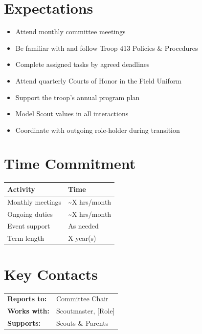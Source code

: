 \documentclass[11pt, letterpaper]{article}
\begin{document}
\hfill
\begin{minipage}[t]{0.48\linewidth}
\raggedright

\section{Expectations}
\begin{itemize}
  \item Attend monthly committee meetings
  \item Be familiar with and follow Troop 413 Policies \& Procedures
  \item Complete assigned tasks by agreed deadlines
  \item Attend quarterly Courts of Honor in the Field Uniform
  \item Support the troop's annual program plan
  \item Model Scout values in all interactions
  \item Coordinate with outgoing role-holder during transition
\end{itemize}

\section{Time Commitment}
\begin{tabular}{@{}p{3.0cm} p{3.8cm}@{}}
  \toprule
  \textbf{Activity} & \textbf{Time} \\
  \midrule
  Monthly meetings  & \textasciitilde{}X hrs/month \\
  Ongoing duties    & \textasciitilde{}X hrs/month \\
  Event support     & As needed \\
  Term length       & X year(s) \\
  \bottomrule
\end{tabular}

\vspace{1em}

\section{Key Contacts}
\begin{tabular}{@{}p{2.6cm} >{\raggedright\arraybackslash}p{4.2cm}@{}}
  \textbf{Reports to:}  & Committee Chair \\
  \textbf{Works with:}  & Scoutmaster, [Role] \\
  \textbf{Supports:}    & Scouts \& Parents \\
\end{tabular}

\end{minipage}
\end{document}

